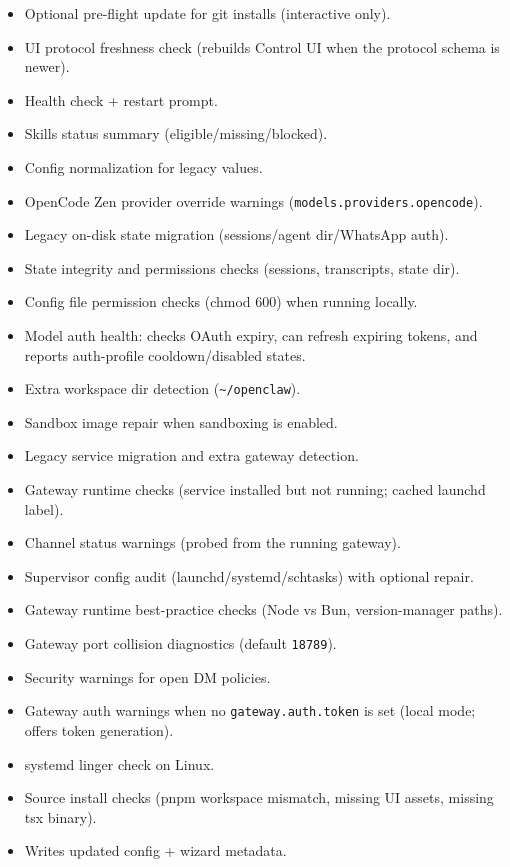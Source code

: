 \begin{itemize}
  \item Optional pre-flight update for git installs (interactive only).
  \item UI protocol freshness check (rebuilds Control UI when the protocol schema is newer).
  \item Health check + restart prompt.
  \item Skills status summary (eligible/missing/blocked).
  \item Config normalization for legacy values.
  \item OpenCode Zen provider override warnings (\texttt{models.providers.opencode}).
  \item Legacy on-disk state migration (sessions/agent dir/WhatsApp auth).
  \item State integrity and permissions checks (sessions, transcripts, state dir).
  \item Config file permission checks (chmod 600) when running locally.
  \item Model auth health: checks OAuth expiry, can refresh expiring tokens, and reports auth-profile cooldown/disabled states.
  \item Extra workspace dir detection (\texttt{\textasciitilde{}/openclaw}).
  \item Sandbox image repair when sandboxing is enabled.
  \item Legacy service migration and extra gateway detection.
  \item Gateway runtime checks (service installed but not running; cached launchd label).
  \item Channel status warnings (probed from the running gateway).
  \item Supervisor config audit (launchd/systemd/schtasks) with optional repair.
  \item Gateway runtime best-practice checks (Node vs Bun, version-manager paths).
  \item Gateway port collision diagnostics (default \texttt{18789}).
  \item Security warnings for open DM policies.
  \item Gateway auth warnings when no \texttt{gateway.auth.token} is set (local mode; offers token generation).
  \item systemd linger check on Linux.
  \item Source install checks (pnpm workspace mismatch, missing UI assets, missing tsx binary).
  \item Writes updated config + wizard metadata.
\end{itemize}


